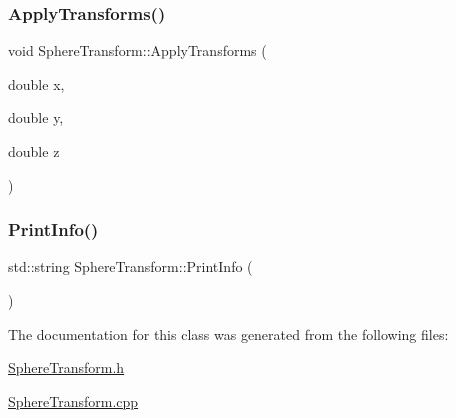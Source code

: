 \mbox{\label{class_sphere_transform_af8719b3fcc492e786ab399bd149bd402}} 
\subsubsection{\texorpdfstring{ApplyTransforms()}{ApplyTransforms()}}
{\footnotesize\ttfamily void Sphere\+Transform\+::\+Apply\+Transforms (\begin{DoxyParamCaption}\item[{double}]{x,  }\item[{double}]{y,  }\item[{double}]{z }\end{DoxyParamCaption})}

\mbox{\label{class_sphere_transform_adbcb07243dd43a521a78fd6b23c9cea5}} 
\subsubsection{\texorpdfstring{PrintInfo()}{PrintInfo()}}
{\footnotesize\ttfamily std\+::string Sphere\+Transform\+::\+Print\+Info (\begin{DoxyParamCaption}{ }\end{DoxyParamCaption})}



The documentation for this class was generated from the following files\+:\begin{DoxyCompactItemize}
\item 
\mbox{\hyperlink{_sphere_transform_8h}{Sphere\+Transform.\+h}}\item 
\mbox{\hyperlink{_sphere_transform_8cpp}{Sphere\+Transform.\+cpp}}\end{DoxyCompactItemize}
